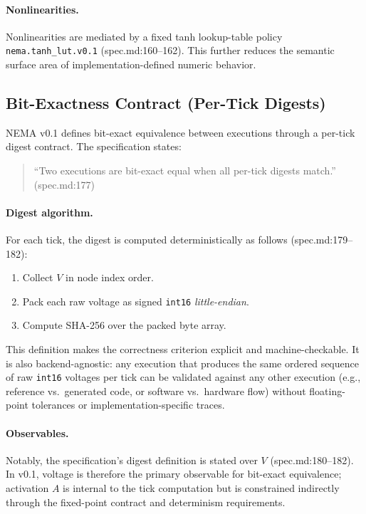 \paragraph{Nonlinearities.}
Nonlinearities are mediated by a fixed tanh lookup-table policy \texttt{nema.tanh\_lut.v0.1} (spec.md:160–162). This further reduces the semantic surface area of implementation-defined numeric behavior.

\subsection{Bit-Exactness Contract (Per-Tick Digests)}
\label{sec:bitexact}
NEMA v0.1 defines bit-exact equivalence between executions through a per-tick digest contract. The specification states:
\begin{quote}
“Two executions are bit-exact equal when all per-tick digests match.” (spec.md:177)
\end{quote}

\paragraph{Digest algorithm.}
For each tick, the digest is computed deterministically as follows (spec.md:179–182):
\begin{enumerate}
\item Collect $V$ in node index order.
\item Pack each raw voltage as signed \texttt{int16} \emph{little-endian}.
\item Compute SHA-256 over the packed byte array.
\end{enumerate}

This definition makes the correctness criterion explicit and machine-checkable. It is also backend-agnostic: any execution that produces the same ordered sequence of raw \texttt{int16} voltages per tick can be validated against any other execution (e.g., reference vs.\ generated code, or software vs.\ hardware flow) without floating-point tolerances or implementation-specific traces.

\paragraph{Observables.}
Notably, the specification’s digest definition is stated over $V$ (spec.md:180–182). In v0.1, voltage is therefore the primary observable for bit-exact equivalence; activation $A$ is internal to the tick computation but is constrained indirectly through the fixed-point contract and determinism requirements.

